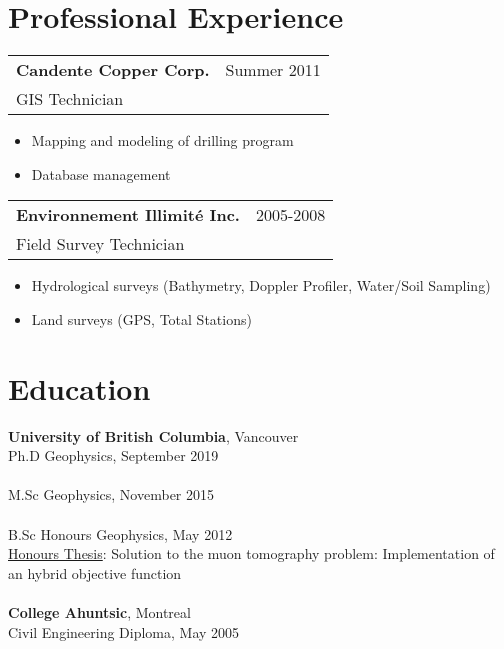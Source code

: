 \documentclass[10pt,a4paper]{article}
\begin{document}
\section{Professional Experience}      
		   \begin{tabular}{p{3in} r}
		    \textbf{Candente Copper Corp.} &  Summer 2011 \\
                  GIS Technician \\
                  \end{tabular}	
                   \begin{itemize} %
                   \setlength\itemsep{00em}
                    \item[] Mapping and modeling of drilling program
                    \item[] Database management 
		   \end{itemize} 
		 \begin{tabular}{p{3in} r}
		 \textbf{Environnement Illimit\'{e} Inc.} &  2005-2008 \\
                  Field Survey Technician \\
                  \end{tabular}	
                   \begin{itemize} %
                   \setlength\itemsep{00em}
                    \item[] Hydrological surveys (Bathymetry, Doppler Profiler, Water/Soil Sampling)
                    \item[] Land surveys (GPS, Total Stations)
		   \end{itemize} 

\section{Education}      

 		\textbf{University of British Columbia}, Vancouver \\
                Ph.D Geophysics, September 2019 \\ \\
                M.Sc Geophysics, November 2015 \\ \\
                B.Sc Honours Geophysics, May 2012 \\
                \underline{Honours Thesis}: 
                Solution to the muon tomography problem: Implementation of an hybrid objective function \\\\
		\textbf{College Ahuntsic}, Montreal \\
                Civil Engineering Diploma, May 2005 \\       
\end{document}
